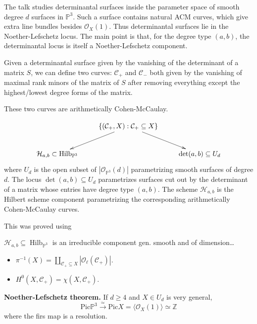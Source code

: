 \medskip\noindent
The talk studies determinantal surfaces
inside the parameter space of smooth
degree $d$ surfaces in $\mathbb{P}^3$.
Such a surface contains natural ACM curves,
which give extra line bundles besides
$\mathcal{O}_X(1)$.
Thus determinantal surfaces lie in the
Noether-Lefschetz locus. The main point is
that, for the degree type $(a,b)$, the
determinantal locus is itself a
Noether-Lefschetz component.

\medskip\noindent
Given a determinantal surface given
by the vanishing of the determinant
of a matrix $S$, we can define two curves:
$\mathcal{C}_+$ and $\mathcal{C}_-$
both given by the vanishing of maximal
rank minors of the matrix of $S$ after
removing everything except the highest/lowest
degree forms of the matrix.

These two curves are arithmetically
Cohen-McCaulay.

\begin{theorem}[L,LH,V, 24]
\label{theorem-llhv24}
$$
\xymatrix{
&\{(\mathcal{C}_+,X):\mathcal{C}_+ \subseteq X\}
\ar[dr]\ar[dl]\\
\mathcal{H}_{a,b}\subset
\operatorname{Hilb}_{\mathbb{P}^3}
& &
\det(a,b) \subseteq U_d
}
$$
where
$U_d$ is the open subset of
$|\mathcal{O}_{\mathbb{P}^3}(d)|$
parametrizing smooth surfaces of degree $d$.
The locus $\det(a,b)\subseteq U_d$
parametrizes surfaces cut out by the
determinant of a matrix whose entries have
degree type $(a,b)$.
The scheme $\mathcal{H}_{a,b}$ is the
Hilbert scheme component parametrizing
the corresponding arithmetically
Cohen-McCaulay curves.
\end{theorem}

\noindent
This was proved using
\begin{theorem}[Ellingsrad 75]
\label{theorem-ellin75}
$\mathcal{H}_{a,b} \subseteq
\operatorname{Hilb}_{\mathbb{P}^3}$
is an irreducible component gen. smooth
and of dimension…
\end{theorem}

\begin{proposition}
\label{proposition-}
\begin{itemize}
\item $\pi^{-1}(X)
=
\coprod_{\mathcal{C}_+ \subseteq X}
|\mathcal{O}_\ell(\mathcal{C}_+)|$.
\item $H^0(X,\mathcal{C}_+)
=
\chi(X,\mathcal{C}_+)$.
\end{itemize}
\end{proposition}

\medskip\noindent
{\bf Noether-Lefschetz theorem.} 
If $d \geq  4$ and $X \in U_d$
is very general,
$$
\text{Pic}\mathbb{P}^3
\xrightarrow{\simeq}
\text{Pic}X 
=
\langle \mathcal{O}_X(1)\rangle
\simeq \mathbb{Z}
$$
where the firs map is a resolution.

